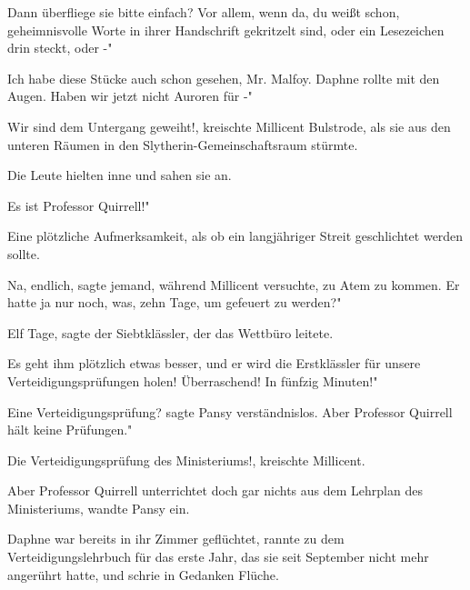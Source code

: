 \glqq Dann überfliege sie bitte einfach? Vor allem, wenn da, du weißt schon,
geheimnisvolle Worte in ihrer Handschrift gekritzelt sind, oder ein Lesezeichen
drin steckt, oder -"

\glqq Ich habe diese Stücke auch schon gesehen, Mr. Malfoy.\grqq{} Daphne rollte
mit den Augen. \glqq Haben wir jetzt nicht Auroren für -"

\glqq Wir sind dem Untergang geweiht!\grqq{}, kreischte Millicent Bulstrode, als
sie aus den unteren Räumen in den Slytherin-Gemeinschaftsraum stürmte.

Die Leute hielten inne und sahen sie an.

\glqq Es ist Professor Quirrell!"

Eine plötzliche Aufmerksamkeit, als ob ein langjähriger Streit geschlichtet
werden sollte.

\glqq Na, endlich\grqq{}, sagte jemand, während Millicent versuchte, zu Atem zu
kommen. \glqq Er hatte ja nur noch, was, zehn Tage, um gefeuert zu werden?"

\glqq Elf Tage\grqq{}, sagte der Siebtklässler, der das Wettbüro leitete.

\glqq Es geht ihm plötzlich etwas besser, und er wird die Erstklässler für
unsere Verteidigungsprüfungen holen! Überraschend! In fünfzig Minuten!"

\glqq Eine Verteidigungsprüfung?\grqq{} sagte Pansy verständnislos. \glqq Aber
Professor Quirrell hält keine Prüfungen."

\glqq Die Verteidigungsprüfung des Ministeriums!\grqq{}, kreischte Millicent.

\glqq Aber Professor Quirrell unterrichtet doch gar nichts aus dem Lehrplan des
Ministeriums\grqq{}, wandte Pansy ein.

Daphne war bereits in ihr Zimmer geflüchtet, rannte zu dem Verteidigungslehrbuch
für das erste Jahr, das sie seit September nicht mehr angerührt hatte, und
schrie in Gedanken Flüche.


